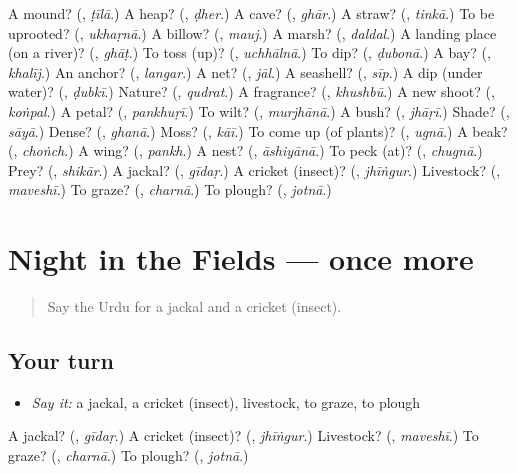 \begin{tcolorbox}[breakable,colback=teal!4,colframe=teal!35!black,title={Before you move on}]
A mound? (\textbf{}, \emph{ṭīlā}.) A heap? (\textbf{}, \emph{ḍher}.) A cave? (\textbf{}, \emph{ghār}.) A straw? (\textbf{}, \emph{tinkā}.) To be uprooted? (\textbf{}, \emph{ukhaṛnā}.) A billow? (\textbf{}, \emph{mauj}.) A marsh? (\textbf{}, \emph{daldal}.) A landing place (on a river)? (\textbf{}, \emph{ghāṭ}.) To toss (up)? (\textbf{}, \emph{uchhālnā}.) To dip? (\textbf{}, \emph{ḍubonā}.) A bay? (\textbf{}, \emph{khalīj}.) An anchor? (\textbf{}, \emph{langar}.) A net? (\textbf{}, \emph{jāl}.) A seashell? (\textbf{}, \emph{sīp}.) A dip (under water)? (\textbf{}, \emph{ḍubkī}.) Nature? (\textbf{}, \emph{qudrat}.) A fragrance? (\textbf{}, \emph{khushbū}.) A new shoot? (\textbf{}, \emph{koṅpal}.) A petal? (\textbf{}, \emph{pankhuṛī}.) To wilt? (\textbf{}, \emph{murjhānā}.) A bush? (\textbf{}, \emph{jhāṛī}.) Shade? (\textbf{}, \emph{sāyā}.) Dense? (\textbf{}, \emph{ghanā}.) Moss? (\textbf{}, \emph{kāī}.) To come up (of plants)? (\textbf{}, \emph{ugnā}.) A beak? (\textbf{}, \emph{choṅch}.) A wing? (\textbf{}, \emph{pankh}.) A nest? (\textbf{}, \emph{āshiyānā}.) To peck (at)? (\textbf{}, \emph{chugnā}.) Prey? (\textbf{}, \emph{shikār}.) A jackal? (\textbf{}, \emph{gīdaṛ}.) A cricket (insect)? (\textbf{}, \emph{jhīṅgur}.) Livestock? (\textbf{}, \emph{maveshī}.) To graze? (\textbf{}, \emph{charnā}.) To plough? (\textbf{}, \emph{jotnā}.)
\end{tcolorbox}
\section[(dialogue)]{Night in the Fields — once more}

\label{lesson:UR-R439-review-final-439}



\begin{quote}
Say the Urdu for a jackal and a cricket (insect).
\end{quote}

\subsection*{Your turn}
\begin{itemize}
\raggedright
  \item \emph{Say it:} a jackal, a cricket (insect), livestock, to graze, to plough
\end{itemize}

\begin{tcolorbox}[breakable,colback=teal!4,colframe=teal!35!black,title={Before you move on}]
A jackal? (\textbf{}, \emph{gīdaṛ}.) A cricket (insect)? (\textbf{}, \emph{jhīṅgur}.) Livestock? (\textbf{}, \emph{maveshī}.) To graze? (\textbf{}, \emph{charnā}.) To plough? (\textbf{}, \emph{jotnā}.)
\end{tcolorbox}
